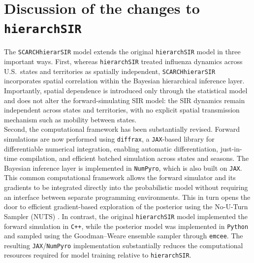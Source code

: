 \documentclass[11pt]{article}
\begin{document}
\section{Discussion of the changes to \texttt{hierarchSIR}}

The \texttt{SCARCHhierarSIR} model extends the original \texttt{hierarchSIR} model in three important ways. First, whereas \texttt{hierarchSIR} treated influenza dynamics across U.S.\ states and territories as spatially independent, \texttt{SCARCHhierarSIR} incorporates spatial correlation within the Bayesian hierarchical inference layer. Importantly, spatial dependence is introduced only through the statistical model and does not alter the forward-simulating SIR model: the SIR dynamics remain independent across states and territories, with no explicit spatial transmission mechanism such as mobility between states.\\

Second, the computational framework has been substantially revised. Forward simulations are now performed using \texttt{diffrax}, a \texttt{JAX}-based library for differentiable numerical integration, enabling automatic differentiation, just-in-time compilation, and efficient batched simulation across states and seasons. The Bayesian inference layer is implemented in \texttt{NumPyro}, which is also built on \texttt{JAX}. This common computational framework allows the forward simulator and its gradients to be integrated directly into the probabilistic model without requiring an interface between separate programming environments. This in turn opens the door to efficient gradient-based exploration of the posterior using the No-U-Turn Sampler (NUTS) \citep{hoffman2011}. In contrast, the original \texttt{hierarchSIR} model implemented the forward simulation in \texttt{C++}, while the posterior model was implemented in \texttt{Python} and sampled using the Goodman--Weare ensemble sampler through \texttt{emcee}. The resulting \texttt{JAX}/\texttt{NumPyro} implementation substantially reduces the computational resources required for model training relative to \texttt{hierarchSIR}.\\
\end{document}
